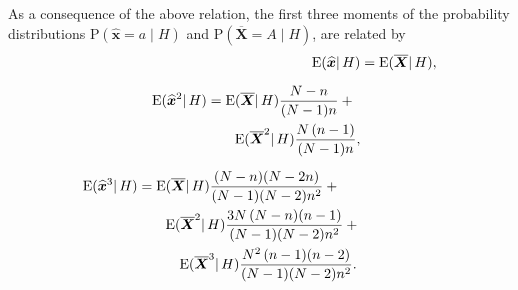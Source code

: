 \documentclass{article}
\theoremstyle{innote}
\newcommand*{\av}{\overline} %
\newcommand*{\sav}{\widehat} %
\newcommand*{\yx}{\bm{x}}%
\newcommand*{\yxs}{\sav{\yx}}%
\newcommand*{\yX}{\bm{X}}%
\newcommand*{\yXf}{\av{\yX}}%
\newcommand*{\yH}{\varEta}
\newcommand*{\cond}%
{\mathpunct{|}}%
\newcommand*{\p}{\mathrm{P}}%
\renewcommand*{\|}{\cond}
\newcommand*{\+}{\lor}
\let\varEta H
\newcommand*{\E}{\mathrm{E}}
\DeclarePairedDelimiter\expp{(}{)}
\newcommand*{\expe}{\E\expp}%
\begin{document}
As a consequence of the above relation, the first three moments of the
probability distributions $\p(\yxs=a\cond\yH)$ and $\p(\yXf=A\cond\yH)$,
are related by
\begin{subequations}\label{eq:moments}
  \begin{align}
    \expe{\yxs \cond \yH} &= \expe{\yXf \cond \yH},
    \\[2\jot]
    \begin{split}
    \expe{\yxs^2 \cond \yH} &= \expe{\yXf \cond \yH}
                                  \frac{N-n}{(N-1)n}
 +{}
\\&\quad\quad \expe{\yXf^2 \cond \yH}\frac{N\,(n-1)}{(N-1)n},
\end{split}
    \\[2\jot]
    \begin{split}
    \expe{\yxs^3 \cond \yH} &=
                              \expe{\yXf \cond \yH}\frac{(N-n)(N-2n)}{(N-1)(N-2)n^2}+{}
                                    \\
                                    &\quad\quad\expe{\yXf^2 \cond \yH}
                                    \frac{3N\,(N-n)(n-1)}{(N-1)(N-2)n^2} +{}
                                    \\
                                    &\quad\quad\quad\expe{\yXf^3 \cond \yH}
                                    \frac{N^2\,(n-1)(n-2)}{(N-1)(N-2)n^2}.
                                  \end{split}
  \end{align}
\end{subequations}
\end{document}
